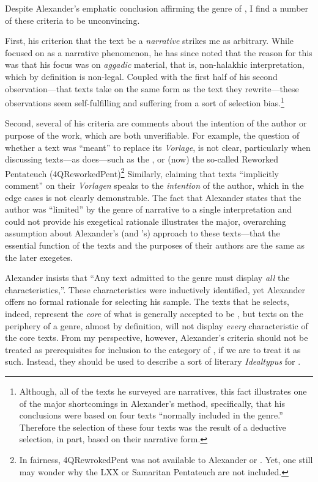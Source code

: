 Despite Alexander's emphatic conclusion affirming the genre of
\RwB, I find a number of these criteria to be
unconvincing.

First, his criterion that the text be a \emph{narrative} strikes me as
arbitrary. While \vermes focused on \rwb
as a narrative phenomenon, he has since noted that the reason for this
was that his focus was on \emph{aggadic} material, that is, non-halakhic
interpretation, which by definition is non-legal. Coupled with the first
half of his second observation---that \rwb texts take on
the same form as the text they rewrite---these observations seem
self-fulfilling and suffering from a sort of selection bias.\footnote{Although,
  all of the texts he surveyed are narratives, this fact illustrates one
  of the major shortcomings in Alexander's method, specifically, that
  his conclusions were based on four texts ``normally included in the
  genre.''\autocite[99]{alexander_carson-williamson1988} Therefore the
  selection of these four texts was the result of a deductive selection,
  in part, based on their narrative form.}

Second, several of his criteria are comments about the intention of the
author or purpose of the work, which are both unverifiable. For example,
the question of whether a \rwb text was ``meant'' to
replace its \emph{Vorlage}, is not clear, particularly when discussing
texts---as \vermes does---such as the
\pTarg, or (now) the so-called Reworked Pentateuch
(4QReworkedPent)\footnote{In fairness, 4QRewrokedPent was not available
  to Alexander or \vermes. Yet, one still may wonder why
  the LXX or Samaritan Pentateuch are not included.} Similarly, claiming
that \rwb texts ``implicitly comment'' on their
\emph{Vorlagen} speaks to the \emph{intention} of the author, which in
the edge cases is not clearly demonstrable. The fact that Alexander
states that the author was ``limited'' by the genre of narrative to a
single interpretation and could not provide his exegetical rationale
illustrates the major, overarching assumption about Alexander's (and
\vermes's) approach to these texts---that the essential
function of the texts and the purposes of their authors are the same as
the later exegetes.

Alexander insists that ``Any text admitted to the genre must display
\emph{all} the characteristics,''\autocite[119 n.
11]{alexander_carson-williamson1988}. These characteristics were
inductively identified, yet Alexander offers no formal rationale for
selecting his sample. The texts that he selects, indeed, represent the
\emph{core} of what is generally accepted to be \rwb,
but texts on the periphery of a genre, almost by definition, will not
display \emph{every} characteristic of the core texts. From my
perspective, however, Alexander's criteria should not be treated as
prerequisites for inclusion to the category of \rwb, if
we are to treat it as such. Instead, they should be used to describe a
sort of literary \emph{Idealtypus} for \rwb.

